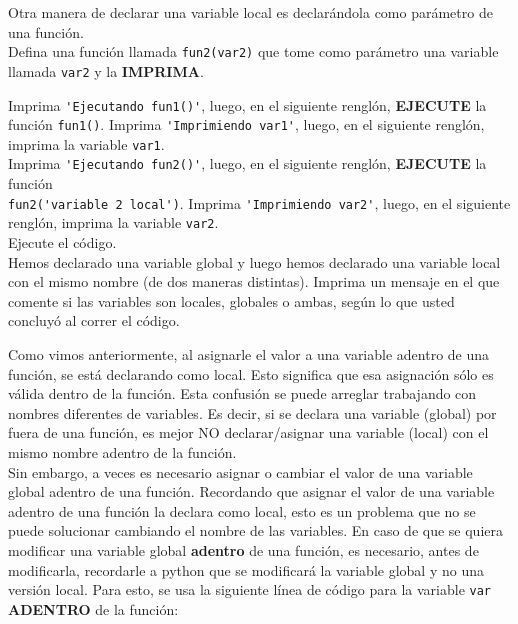 \documentclass[11pt,letterpaper]{exam}
\begin{document}
\begin{questions}
Otra manera de declarar una variable local es declar\'andola como par\'ametro de una funci\'on. \\

Defina una funci\'on llamada \verb"fun2(var2)" que tome como par\'ametro una variable llamada \verb"var2" y la \textbf{IMPRIMA}.



Imprima \verb"'Ejecutando fun1()'", luego, en el siguiente rengl\'on, \textbf{EJECUTE} la funci\'on \verb"fun1()". Imprima \verb"'Imprimiendo var1'", luego, en el siguiente rengl\'on, imprima la variable \verb"var1". \\

Imprima \verb"'Ejecutando fun2()'", luego, en el siguiente rengl\'on, \textbf{EJECUTE} la funci\'on\\ \verb"fun2('variable 2 local')". Imprima \verb"'Imprimiendo var2'", luego, en el siguiente rengl\'on, imprima la variable \verb"var2". \\

Ejecute el c\'odigo.\\

Hemos declarado una variable global y luego hemos declarado una variable local con el mismo nombre (de dos maneras distintas). Imprima un mensaje en el que comente si las variables son locales, globales o ambas, seg\'un lo que usted concluy\'o al correr el c\'odigo.


Como vimos anteriormente, al asignarle el valor a una variable adentro de una funci\'on, se est\'a declarando como local. Esto significa que esa asignaci\'on s\'olo es v\'alida dentro de la funci\'on. Esta confusi\'on se puede arreglar trabajando con nombres diferentes de variables. Es decir, si se declara una variable (global) por fuera de una funci\'on, es mejor NO declarar/asignar una variable (local) con el mismo nombre adentro de la funci\'on.\\

Sin embargo, a veces es necesario asignar o cambiar el valor de una variable global adentro de una funci\'on. Recordando que asignar el valor de una variable adentro de una funci\'on la declara como local, esto es un problema que no se puede solucionar cambiando el nombre de las variables. En caso de que se quiera modificar una variable global \textbf{adentro} de una funci\'on, es necesario, antes de modificarla, recordarle a python que se modificar\'a la variable global y no una versi\'on local. Para esto, se usa la siguiente l\'inea de c\'odigo para la variable \verb"var" \textbf{ADENTRO} de la funci\'on:


\end{questions}
\end{document}
